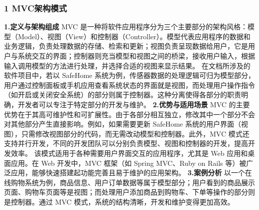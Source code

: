 \subsubsection{1 MVC架构模式}\label{mvcux67b6ux6784ux6a21ux5f0f} \textbf{1.定义与架构组成} MVC
是一种将软件应用程序分为三个主要部分的架构风格：模型（Model）、视图（View）和控制器（Controller）。模型代表应用程序的数据和业务逻辑，负责处理数据的存储、检索和更新；视图负责呈现数据给用户，它是用户与系统交互的界面；控制器则充当模型和视图之间的桥梁，接收用户输入，根据输入调用模型的方法进行处理，并选择合适的视图来显示结果。
在文档所涉及的软件项目中，若以 SafeHome
系统为例，传感器数据的处理逻辑可归为模型部分，用户通过控制面板或手机应用查看系统状态的界面就是视图，而处理用户操作指令（如开启或关闭安全系统）的部分则属于控制器。这种分离使得各部分的职责明确，开发者可以专注于特定部分的开发与维护。
\textbf{2.优势与适用场景} MVC 的主要优势在于其高可维护性和可扩展性。由于各部分相互独立，修改其中一个部分不会对其他部分产生直接影响。例如，如果需要更新 SafeHome
系统的用户界面（视图），只需修改视图部分的代码，而无需改动模型和控制器。此外，MVC 模式还支持并行开发，不同的开发团队可以分别负责模型、视图和控制器的开发，提高开发效率。 该模式适用于各种需要用户界面交互的应用程序，尤其是 Web
应用和桌面应用。在 Web 开发中，MVC 框架（如 Spring MVC、Ruby on Rails 等）被广泛应用，能够快速搭建起功能完善且易于维护的应用架构。 \textbf{3.案例分析}
以一个在线购物系统为例，商品信息、用户订单数据等属于模型部分；用户看到的商品展示页面、购物车页面等是视图；而处理用户添加商品到购物车、下单等操作的部分则是控制器。通过 MVC 模式，系统的结构清晰，开发和维护变得更加高效。
